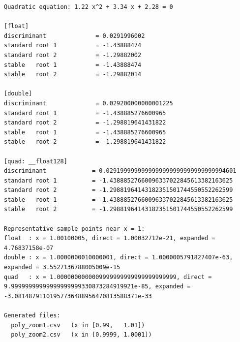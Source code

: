 \documentclass[12pt,a4paper]{article}
\begin{document}
\begin{lstlisting}
Quadratic equation: 1.22 x^2 + 3.34 x + 2.28 = 0

[float]
discriminant              = 0.0291996002
standard root 1           = -1.43888474
standard root 2           = -1.29882002
stable   root 1           = -1.43888474
stable   root 2           = -1.29882014

[double]
discriminant              = 0.029200000000001225
standard root 1           = -1.438885276600965
standard root 2           = -1.298819641431822
stable   root 1           = -1.438885276600965
stable   root 2           = -1.298819641431822

[quad: __float128]
discriminant             = 0.0291999999999999999999999999999994601
standard root 1          = -1.43888527660096337022845613382163625
standard root 2          = -1.29881964143182351501744550552262599
stable   root 1          = -1.43888527660096337022845613382163625
stable   root 2          = -1.29881964143182351501744550552262599

Representative sample points near x = 1:
float  : x = 1.00100005, direct = 1.00032712e-21, expanded = 4.76837158e-07
double : x = 1.0000000010000001, direct = 1.0000005791827407e-63, expanded = 3.5527136788005009e-15
quad   : x = 1.0000000000009999999999999999999999, direct = 9.99999999999999999999330873284919921e-85, expanded = -3.08148791101957736488956470813588371e-33

Generated files:
  poly_zoom1.csv   (x in [0.99,   1.01])
  poly_zoom2.csv   (x in [0.9999, 1.0001])
\end{lstlisting}
\end{document}
